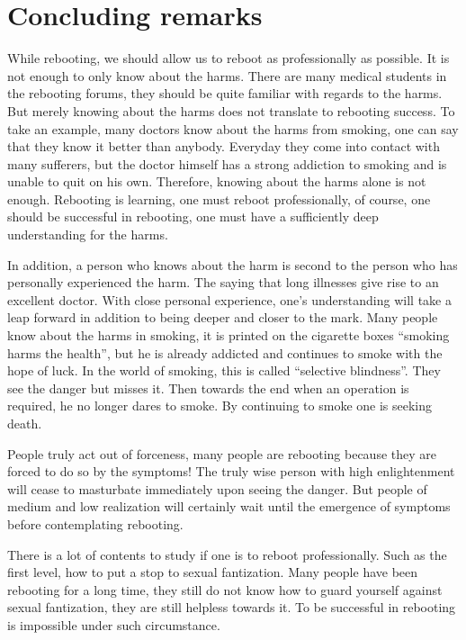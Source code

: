 \documentclass[
]{book}
\begin{document}
\hypertarget{concluding-remarks-4}{%
\section{Concluding remarks}\label{concluding-remarks-4}}

While rebooting, we should allow us to reboot as professionally as possible. It is not enough to only know about the harms. There are many medical students in the rebooting forums, they should be quite familiar with regards to the harms. But merely knowing about the harms does not translate to rebooting success. To take an example, many doctors know about the harms from smoking, one can say that they know it better than anybody. Everyday they come into contact with many sufferers, but the doctor himself has a strong addiction to smoking and is unable to quit on his own. Therefore, knowing about the harms alone is not enough. Rebooting is learning, one must reboot professionally, of course, one should be successful in rebooting, one must have a sufficiently deep understanding for the harms.

In addition, a person who knows about the harm is second to the person who has personally experienced the harm. The saying that long illnesses give rise to an excellent doctor. With close personal experience, one's understanding will take a leap forward in addition to being deeper and closer to the mark. Many people know about the harms in smoking, it is printed on the cigarette boxes ``smoking harms the health'', but he is already addicted and continues to smoke with the hope of luck. In the world of smoking, this is called ``selective blindness''. They see the danger but misses it. Then towards the end when an operation is required, he no longer dares to smoke. By continuing to smoke one is seeking death.

People truly act out of forceness, many people are rebooting because they are forced to do so by the symptoms! The truly wise person with high enlightenment will cease to masturbate immediately upon seeing the danger. But people of medium and low realization will certainly wait until the emergence of symptoms before contemplating rebooting.

There is a lot of contents to study if one is to reboot professionally. Such as the first level, how to put a stop to sexual fantization. Many people have been rebooting for a long time, they still do not know how to guard yourself against sexual fantization, they are still helpless towards it. To be successful in rebooting is impossible under such circumstance.
\end{document}
